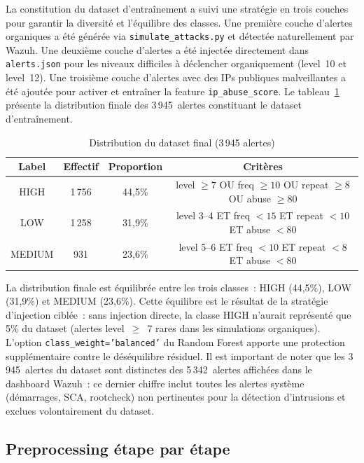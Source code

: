 \documentclass[12pt,a4paper]{report}
\begin{document}
La constitution du dataset d'entraînement a suivi une stratégie en trois couches pour garantir la diversité et l'équilibre des classes. Une première couche d'alertes organiques a été générée via \texttt{simulate\_attacks.py} et détectée naturellement par Wazuh. Une deuxième couche d'alertes a été injectée directement dans \texttt{alerts.json} pour les niveaux difficiles à déclencher organiquement (level~10 et level~12). Une troisième couche d'alertes avec des IPs publiques malveillantes a été ajoutée pour activer et entraîner la feature \texttt{ip\_abuse\_score}. Le tableau~\ref{tab:dataset} présente la distribution finale des 3\,945~alertes constituant le dataset d'entraînement.

\begin{table}[H]
\centering
\caption{Distribution du dataset final (3\,945 alertes)}
\label{tab:dataset}
\begin{tabular}{|c|c|c|c|}
\hline
\rowcolor{ColSection!15}
\textbf{Label} & \textbf{Effectif} & \textbf{Proportion} & \textbf{Critères} \\
\hline
HIGH   & 1\,756 & 44,5\% & level $\geq 7$ OU freq $\geq 10$ OU repeat $\geq 8$ OU abuse $\geq 80$ \\
LOW    & 1\,258 & 31,9\% & level 3--4 ET freq $< 15$ ET repeat $< 10$ ET abuse $< 80$ \\
MEDIUM &   931  & 23,6\% & level 5--6 ET freq $< 10$ ET repeat $< 8$ ET abuse $< 80$ \\
\hline
\end{tabular}
\end{table}

La distribution finale est équilibrée entre les trois classes~: HIGH (44,5\%), LOW (31,9\%) et MEDIUM (23,6\%). Cette équilibre est le résultat de la stratégie d'injection ciblée~: sans injection directe, la classe HIGH n'aurait représenté que 5\% du dataset (alertes level~$\geq$~7 rares dans les simulations organiques). L'option \texttt{class\_weight='balanced'} du Random Forest apporte une protection supplémentaire contre le déséquilibre résiduel. Il est important de noter que les 3\,945~alertes du dataset sont distinctes des 5\,342~alertes affichées dans le dashboard Wazuh~: ce dernier chiffre inclut toutes les alertes système (démarrages, SCA, rootcheck) non pertinentes pour la détection d'intrusions et exclues volontairement du dataset.

\subsection{Preprocessing étape par étape}
\end{document}
